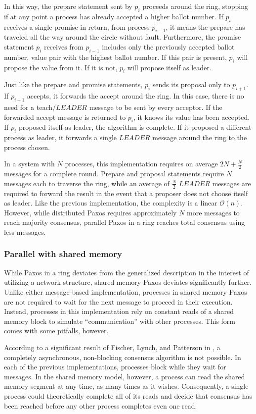 \documentclass[12pt]{article}
\renewcommand{\O}{\mathcal{O}}
\begin{document}
In this way, the prepare statement sent by $p_i$ proceeds around the ring, stopping
if at any point a process has already accepted a higher ballot number. If $p_i$
receives a single promise in return, from process $p_{i-1}$, it means the prepare
has traveled all the way around the circle without fault. Furthermore, the promise
statement $p_i$ receives from $p_{i-1}$ includes only the previously accepted ballot number,
value pair with the highest ballot number. If this pair is present, $p_i$ will propose
the value from it. If it is not, $p_i$ will propose itself as leader.

Just like the prepare and promise statements, $p_i$ sends its proposal only to $p_{i+1}$.
If $p_{i+1}$ accepts, it forwards the accept around the ring. In this case, there
is no need for a teach/$LEADER$ message to be sent by every acceptor. If the forwarded
accept message is returned to $p_i$, it knows its value has been accepted. If $p_i$ proposed
itself as leader, the algorithm is complete. If it proposed a different process as leader,
it forwards a single $LEADER$ message around the ring to the process chosen.

In a system with $N$ processes, this implementation requires on average $2N + \frac{N}{2}$
messages for a complete round. Prepare and proposal statements require $N$ messages each
to traverse the ring, while an average of $\frac{N}{2}$ $LEADER$ messages are required
to forward the result in the event that a proposer does not choose itself as leader.
Like the previous implementation, the complexity is a linear $\O(n)$. However, while
distributed Paxos requires approximately $N$ more messages to reach majority consensus,
parallel Paxos in a ring reaches total consensus using less messages.

\subsubsection{Parallel with shared memory}
While Paxos in a ring deviates from the generalized description in the interest
of utilizing a network structure, shared memory Paxos deviates significantly further.
Unlike either message-based implementation, processes in shared memory Paxos are not
required to wait for the next message to proceed in their execution. Instead, processes
in this implementation rely on constant reads of a shared memory block to simulate
``communication'' with other processes. This form comes with some pitfalls, however.

According to a significant result of Fischer, Lynch, and Patterson in \cite{imposs},
a completely asynchronous, non-blocking consensus algorithm is not possible.
In each of the previous implementations, processes block while they wait for messages.
In the shared memory model, however, a process can read the shared memory segment at any
time, as many times as it wishes. Consequently, a single process could theoretically complete
all of its reads and decide that consensus has been reached before any other process
completes even one read.
\end{document}
